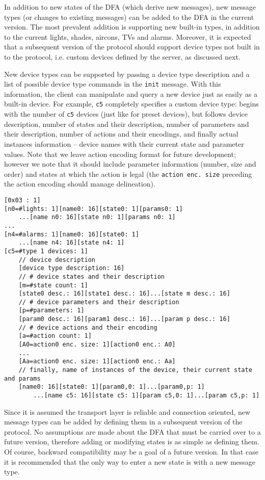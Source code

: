 In addition to new states of the DFA (which derive new messages), new message types (or changes to existing messages) can be added to the DFA in the current version. The most prevalent addition is supporting new built-in types, in addition to the current lights, shades, aircons, TVs and alarms. Moreover, it is expected that a subsequent version of the protocol should support device types not built in to the protocol, i.e. custom devices defined by the server, as discussed next.

New device types can be supported by passing a device type description and a list of possible device type commands in the {\tt init} message.  With this information, the client can manipulate and query a new device just as easily as a built-in device.  For example, {\tt c5} completely specifies a custom device type: begins with the number of {\tt c5} devices (just like for preset devices), but follows device description, number of states and their description, number of parameters and their description, number of actions and their encodings, and finally actual instances information -- device names with their current state and parameter values. Note that we leave action encoding format for future development; however we note that it should include parameter information (number, size and order) and states at which the action is legal (the {\tt action enc. size} preceding the action encoding should manage delineation).

\begin{verbatim}
[0x03 : 1]
[n0=#lights: 1][name0: 16][state0: 1][params0: 1]
    ...[name n0: 16][state n0: 1][params n0: 1]
...
[n4=#alarms: 1][name0: 16][state0: 1]
    ...[name n4: 16][state n4: 1]
[c5=#type 1 devices: 1]
    // device description
    [device type description: 16]
    // # device states and their description
    [m=#state count: 1]
    [state0 desc.: 16][state1 desc.: 16]...[state m desc.: 16]
    // # device parameters and their description
    [p=#parameters: 1]
    [param0 desc.: 16][param1 desc.: 16]...[param p desc.: 16]
    // # device actions and their encoding
    [a=#action count: 1]
    [A0=action0 enc. size: 1][action0 enc.: A0]
    ...
    [Aa=action0 enc. size: 1][action0 enc.: Aa]
    // finally, name of instances of the device, their current state and params
    [name0: 16][state0: 1][param0,0: 1]...[param0,p: 1]
        ...[name c5: 16][state c5: 1][param c5,0: 1]...[param c5,p: 1]
\end{verbatim}

Since it is assumed the transport layer is reliable and connection oriented, new message types can be added by defining them in a subsequent version of the protocol. No assumptions are made about the DFA that must be carried over to a future version, therefore adding or modifying states is as simple as defining them. Of course, backward compatibility may be a goal of a future version. In that case it is recommended that the only way to enter a new state is with a new message type.
